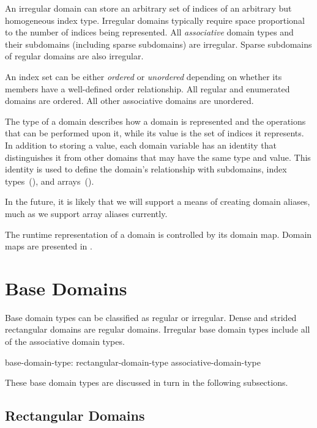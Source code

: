 An irregular domain can store an arbitrary set of indices of an arbitrary but
homogeneous index type.  Irregular domains typically require space proportional
to the number of indices being represented.  All \emph{associative} domain types
and their subdomains (including sparse subdomains) are irregular.  Sparse
subdomains of regular domains are also irregular.

An index set can be either \emph{ordered} or \emph{unordered} depending on
whether its members have a well-defined order relationship.  All regular and
enumerated domains are ordered.  All other associative domains are
unordered.

The type of a domain describes how a domain is represented and the operations
that can be performed upon it, while its value is the set of indices it represents.
In addition to storing a value, each domain variable has an identity that
distinguishes it from other domains that may have the same type and
value.  This identity is used to define the domain's relationship
with subdomains, index types~(),
and arrays~().

\begin{openissue}
In the future, it is likely that we will support a means of creating
domain aliases, much as we support array aliases currently.
\end{openissue}

The runtime representation of a domain is controlled by its domain map.
Domain maps are presented in .


\section{Base Domains}
\label{Base_Domains}

Base domain types can be classified as regular or irregular.  Dense and
strided rectangular domains are regular domains.
Irregular base domain types include all of the associative domain types.

\begin{syntax}
base-domain-type:
  rectangular-domain-type
  associative-domain-type
\end{syntax}

These base domain types are discussed in turn in the following
subsections.

\subsection{Rectangular Domains}

